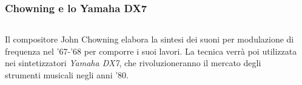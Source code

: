 \begin{frame}
    \frametitle{Chowning e lo Yamaha DX7}
    
    \begin{columns}[T]
        \begin{column}{0.6\textwidth}
            Il compositore John Chowning elabora la sintesi dei suoni per
            modulazione di frequenza nel '67-'68 per comporre i suoi lavori.
            La tecnica verr\`a poi utilizzata nei sintetizzatori \emph{Yamaha
            DX7}, che rivoluzioneranno il mercato degli strumenti musicali
            negli anni '80.
        \end{column}
        \begin{column}{0.4\textwidth}
            \begin{center}
            \end{center}
            \hspace{-4cm}
        \end{column}
    \end{columns}

\end{frame}

